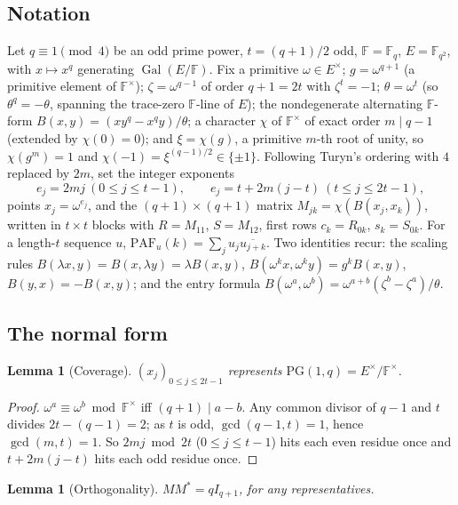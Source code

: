 \documentclass[11pt]{article}
\theoremstyle{plain}
\newtheorem{lemma}[theorem]{Lemma}
\theoremstyle{definition}
\theoremstyle{remark}
\newcommand{\F}{\mathbb F}
\newcommand{\Gal}{\operatorname{Gal}}
\newcommand{\PG}{\mathrm{PG}}
\newcommand{\paf}{\mathrm{PAF}}
\begin{document}
\subsection{Notation}\label{sec:marynotation}

Let $q\equiv1\pmod4$ be an odd prime power, $t=(q+1)/2$ odd, $\F=\F_q$,
$E=\F_{q^2}$, with $x\mapsto x^q$ generating $\Gal(E/\F)$. Fix a primitive
$\omega\in E^\times$; $g=\omega^{q+1}$ (a primitive element of $\F^\times$);
$\zeta=\omega^{q-1}$ of order $q+1=2t$ with $\zeta^t=-1$; $\theta=\omega^t$
(so $\theta^q=-\theta$, spanning the trace-zero $\F$-line of $E$); the
nondegenerate alternating $\F$-form $B(x,y)=(xy^q-x^qy)/\theta$; a character
$\chi$ of $\F^\times$ of exact order $m\mid q-1$ (extended by $\chi(0)=0$); and
$\xi=\chi(g)$, a primitive $m$-th root of unity, so $\chi(g^m)=1$ and
$\chi(-1)=\xi^{(q-1)/2}\in\{\pm1\}$. Following Turyn's ordering with $4$ replaced
by $2m$, set the integer exponents
\begin{equation}\label{eq:ordering}
  e_j=2mj\ (0\le j\le t-1),\qquad e_j=t+2m(j-t)\ (t\le j\le2t-1),
\end{equation}
points $x_j=\omega^{e_j}$, and the $(q+1)\times(q+1)$ matrix
$M_{jk}=\chi(B(x_j,x_k))$, written in $t\times t$ blocks with $R=M_{11}$,
$S=M_{12}$, first rows $c_k=R_{0k}$, $s_k=S_{0k}$. For a length-$t$ sequence $u$,
$\paf_u(k)=\sum_j u_j\overline{u_{j+k}}$. Two identities recur: the scaling
rules $B(\lambda x,y)=B(x,\lambda y)=\lambda B(x,y)$,
$B(\omega^kx,\omega^ky)=g^kB(x,y)$, $B(y,x)=-B(x,y)$; and the entry formula
$B(\omega^a,\omega^b)=\omega^{a+b}(\zeta^b-\zeta^a)/\theta$.

\subsection{The normal form}

\begin{lemma}[Coverage]\label{lem:coverage}
$(x_j)_{0\le j\le2t-1}$ represents $\PG(1,q)=E^\times/\F^\times$.
\end{lemma}

\begin{proof}
$\omega^a\equiv\omega^b\bmod\F^\times$ iff $(q+1)\mid a-b$. Any common divisor of
$q-1$ and $t$ divides $2t-(q-1)=2$; as $t$ is odd, $\gcd(q-1,t)=1$, hence
$\gcd(m,t)=1$. So $2mj\bmod2t$ ($0\le j\le t-1$) hits each even residue once and
$t+2m(j-t)$ hits each odd residue once.
\end{proof}

\begin{lemma}[Orthogonality]\label{lem:orth}
$MM^*=qI_{q+1}$, for any representatives.
\end{lemma}
\end{document}
